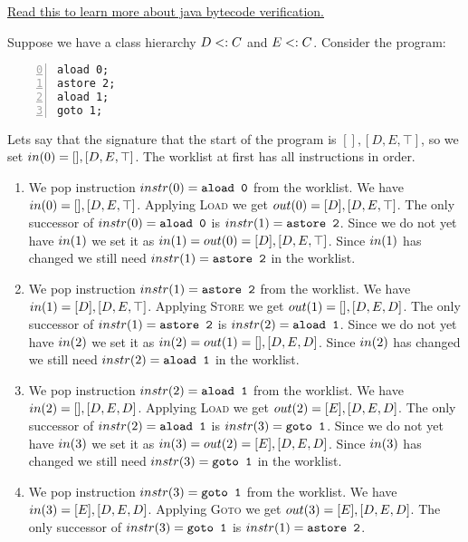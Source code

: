 \documentclass{article}
\begin{document}
\href{https://www.irisa.fr/celtique/teaching/SOS/2021/Leroy-bytecode-verification-JAR.pdf}{Read this to learn more about java bytecode verification.}

\begin{example}
  Suppose we have a class hierarchy $D <: C$ and $E <: C$.
  Consider the program:
\begin{lstlisting}[language=JVMIS, numbers=left, firstnumber=0, escapechar=|]
aload 0;
astore 2;
aload 1;
goto 1;
\end{lstlisting}
  Lets say that the signature that the start of the program is $[], [D,E,\top]$,
  so we set $in(0) = [], [D,E,\top]$.
  The worklist at first has all instructions in order.
  \begin{enumerate}
  \item We pop instruction $instr{}(0) = \texttt{aload 0}$ from the worklist.
    We have $in(0) = [], [D,E,\top]$.
    Applying \textsc{Load} we get $out(0) = [D], [D,E,\top]$.
    The only successor of $instr{}(0) = \texttt{aload 0}$ is $instr{}(1) = \texttt{astore 2}$.
    Since we do not yet have $in(1)$ we set it as $in(1) = out(0) = [D], [D,E,\top]$.
    Since $in(1)$ has changed we still need $instr{}(1) = \texttt{astore 2}$ in the worklist.
  \item We pop instruction $instr{}(1) = \texttt{astore 2}$ from the worklist.
    We have $in(1) = [D], [D,E,\top]$.
    Applying \textsc{Store} we get $out(1) = [], [D,E,D]$.
    The only successor of $instr{}(1) = \texttt{astore 2}$ is $instr{}(2) = \texttt{aload 1}$.
    Since we do not yet have $in(2)$ we set it as $in(2) = out(1) = [], [D,E,D]$.
    Since $in(2)$ has changed we still need $instr{}(2) = \texttt{aload 1}$ in the worklist.
  \item We pop instruction $instr{}(2) = \texttt{aload 1}$ from the worklist.
    We have $in(2) = [], [D,E,D]$.
    Applying \textsc{Load} we get $out(2) = [E], [D,E,D]$.
    The only successor of $instr{}(2) = \texttt{aload 1}$ is $instr{}(3) = \texttt{goto 1}$.
    Since we do not yet have $in(3)$ we set it as $in(3) = out(2) = [E], [D,E,D]$.
    Since $in(3)$ has changed we still need $instr{}(3) = \texttt{goto 1}$ in the worklist.
  \item We pop instruction $instr{}(3) = \texttt{goto 1}$ from the worklist.
    We have $in(3) = [E], [D,E,D]$.
    Applying \textsc{Goto} we get $out(3) = [E], [D,E,D]$.
    The only successor of $instr{}(3) = \texttt{goto 1}$ is $instr{}(1) = \texttt{astore 2}$.

\end{enumerate}
\end{example}
\end{document}
